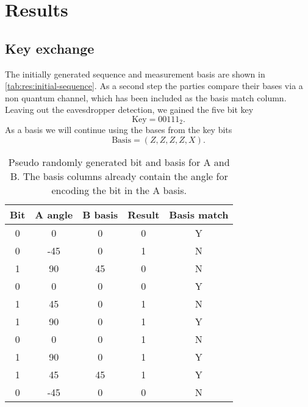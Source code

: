 \section{Results}
\label{sec:results}

\subsection{Key exchange}
\label{sec:Key exchange without Eve}
The initially generated sequence and measurement basis are shown in
\autoref{tab:res:initial-sequence}. As a second step the parties compare their bases via a non
quantum channel, which has been included as the basis match column. Leaving out the eavesdropper
detection, we gained the five bit key
\begin{equation}
  \text{Key} = 00111_2.
  \label{eqn:res:key}
\end{equation}
As a basis we will continue using the bases from the key bits
\begin{equation}
  \text{Basis} = (Z, Z, Z, Z, X). 
\end{equation}

\begin{table}
  \centering
  \caption{Pseudo randomly generated bit and basis for A and B. The basis columns already contain
  the angle for encoding the bit in the A basis.}
  \label{tab:res:initial-sequence}
  \begin{tabular}{c | c | c | c | c}
    Bit & A angle & B basis & Result & Basis match \\
    \hline
    0 & 0 & 0 & 0 & Y \\
    0 & -45 & 0 & 1 & N \\
    1 & 90 & 45 & 0 & N \\
    0 & 0 & 0 & 0 & Y \\
    1 & 45 & 0 & 1 & N \\
    1 & 90 & 0 & 1 & Y \\
    0 & 0 & 0 & 1 & N \\
    1 & 90 & 0 & 1 & Y \\
    1 & 45 & 45 & 1 & Y \\
    0 & -45 & 0 & 0 & N \\
  \end{tabular}
\end{table}

